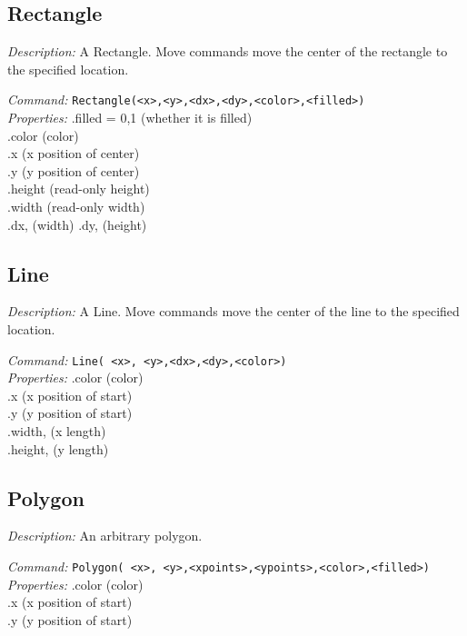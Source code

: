 \subsection{Rectangle}
\emph{Description:} A Rectangle. Move commands move the center
  of the rectangle to the specified location.

\emph{Command:}  \verb+Rectangle(<x>,<y>,<dx>,<dy>,<color>,<filled>)+\\

\emph{Properties:}
.filled = {0,1} (whether it is filled)\\
.color (color) \\
.x  (x position of center) \\
.y  (y position of center)\\
.height (read-only height)\\
.width (read-only width)\\
.dx, (width)
.dy,  (height)\\



\subsection{Line}
\emph{Description:} A Line. Move commands move the center
  of the line to the specified location.

\emph{Command:}  \verb+Line( <x>, <y>,<dx>,<dy>,<color>)+\\

\emph{Properties:}
.color (color) \\
.x  (x position of start) \\
.y  (y position of start)\\
.width, (x length)\\
.height,  (y length)\\




\subsection{Polygon}
\emph{Description:} An arbitrary polygon. 

\emph{Command:}  \verb+Polygon( <x>, <y>,<xpoints>,<ypoints>,<color>,<filled>)+\\

\emph{Properties:}
.color (color) \\
.x  (x position of start) \\
.y  (y position of start)\\

